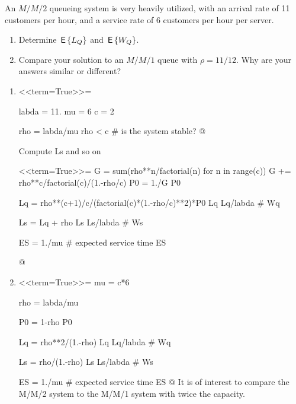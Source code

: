 \begin{question}
  An $M/M/2$ queueing system is very heavily utilized, with an arrival rate of 11 customers per hour, and a  service rate of 6 customers per hour per server.
  \begin{enumerate}
  \item Determine $\,\mathsf{E}\left\{L_Q\right\}$ and $\,\mathsf{E}\left\{W_Q\right\}$.
  \item Compare your solution to an $M/M/1$ queue with $\rho=11/12$. Why are your answers similar or different?
  \end{enumerate}
  \begin{solution}
  \begin{enumerate}
  \item 

<<term=True>>=

labda = 11.
mu = 6
c = 2

rho = labda/mu
rho < c  # is the system stable?
@ 

Compute Ls and so on


<<term=True>>=
G = sum(rho**n/factorial(n) for n in range(c))
G += rho**c/factorial(c)/(1.-rho/c)
P0 = 1./G
P0

Lq = rho**(c+1)/c/(factorial(c)*(1.-rho/c)**2)*P0
Lq
Lq/labda # Wq

Ls = Lq + rho
Ls
Ls/labda # Ws

ES = 1./mu # expected service time
ES

@ 

\item 

<<term=True>>=
mu = c*6

rho = labda/mu

P0 = 1-rho
P0

Lq = rho**2/(1.-rho)
Lq
Lq/labda # Wq

Ls = rho/(1.-rho)
Ls
Ls/labda # Ws

ES = 1./mu # expected service time
ES
@ 
It is of interest to compare the M/M/2 system to the M/M/1 system with twice the capacity. 
  \end{enumerate}
    \end{solution}
\end{question}




